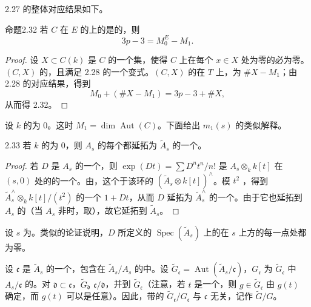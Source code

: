 2.27 的整体对应结果如下。
\begin{SGAresult}{命题}{2.32}
若 $C$ 在 $E$ 的上的是的，则
\[
3p-3=M_0^E-M_1.
\]
\end{SGAresult}
\begin{proof}
设 $X\subset C(k)$ 是 $C$ 的一个集，使得 $C$ 上在每个 $x\in X$ 处为零的必为零。$(C,X)$ 的，且满足 2.28 的一个变式。$(C,X)$ 的在 $T$ 上，为 $\#X-M_1$；由 2.28 的对应结果，得到
\[
M_0+(\#X-M_1)=3p-3+\#X,
\]
从而得 2.32。
\end{proof}
设 $k$ 的为 $0$。这时 $M_1=\dim\operatorname{Aut}(C)$。下面给出 $m_1(s)$ 的类似解释。

\begin{SGAresult}{}{2.33}
若 $k$ 的为 $0$，则 $A_s$ 的每个都延拓为 $\widetilde A_s$ 的一个。
\end{SGAresult}
\begin{proof}
若 $D$ 是 $A_s$ 的一个，则 $\exp(Dt)=\sum D^nt^n/n!$ 是 $A_s\otimes_k k[t]$ 在 $(s,0)$ 处的的一个。由，这个于该环的 $(\widetilde A_s\otimes k[t])^{\wedge}$。模 $t^2$ ，得到 $\widetilde A_s^{\wedge}\otimes_k k[t]/(t^2)$ 的一个 $1+Dt$，从而 $D$ 延拓为 $\widetilde A_s^{\wedge}$ 的一个。由于它也延拓到 $A_s$ 的（当 $A_s$ 非时，取），故它延拓到 $\widetilde A_s$。
\end{proof}
设 $s$ 为。类似的论证说明，$D$ 所定义的 $\operatorname{Spec}(\widetilde A_s)$ 上的在 $s$ 上方的每一点处都为零。

设 $\mathfrak c$ 是 $\widetilde A_s$ 的一个，包含在 $\widetilde A_s/A_s$ 的中。设 $\widetilde G_{\mathfrak c}=\operatorname{Aut}(\widetilde A_s/\mathfrak c)$，$G_{\mathfrak c}$ 为 $\widetilde G_{\mathfrak c}$ 中 $A_s/\mathfrak c$ 的。对 $\mathfrak d\subset\mathfrak c$，$\widetilde G_{\mathfrak d}$  $\mathfrak c/\mathfrak d$，并到 $\widetilde G_{\mathfrak c}$（注意，若 $t$ 是一个，则 $g\in\widetilde G_{\mathfrak c}$ 由 $g(t)$ 确定，而 $g(t)$ 可以是任意）。因此，带的 $\widetilde G_{\mathfrak c}/G_{\mathfrak c}$ 与 $\mathfrak c$ 无关，记作 $\widetilde G/G$。


